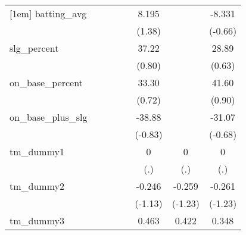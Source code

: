 {\begin{tabular}{l*{7}{c}}
[1em]
batting\_avg &                     &                     &                     &                     &       8.195         &                     &      -8.331         \\
            &                     &                     &                     &                     &      (1.38)         &                     &     (-0.66)         \\
[1em]
slg\_percent &                     &                     &                     &                     &       37.22         &                     &       28.89         \\
            &                     &                     &                     &                     &      (0.80)         &                     &      (0.63)         \\
[1em]
on\_base\_percent&                     &                     &                     &                     &       33.30         &                     &       41.60         \\
            &                     &                     &                     &                     &      (0.72)         &                     &      (0.90)         \\
[1em]
on\_base\_plus\_slg&                     &                     &                     &                     &      -38.88         &                     &      -31.07         \\
            &                     &                     &                     &                     &     (-0.83)         &                     &     (-0.68)         \\
[1em]
tm\_dummy1   &                     &                     &                     &                     &           0         &           0         &           0         \\
            &                     &                     &                     &                     &         (.)         &         (.)         &         (.)         \\
[1em]
tm\_dummy2   &                     &                     &                     &                     &      -0.246         &      -0.259         &      -0.261         \\
            &                     &                     &                     &                     &     (-1.13)         &     (-1.23)         &     (-1.23)         \\
[1em]
tm\_dummy3   &                     &                     &                     &                     &       0.463\sym{*}  &       0.422\sym{*}  &       0.348         \\

\end{tabular}}
